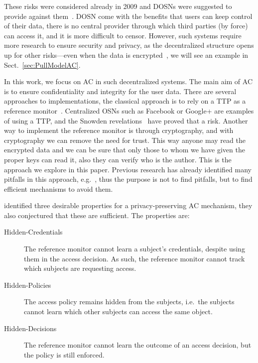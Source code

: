 These risks were considered already in 2009 and \acp{DOSN} were suggested to 
provide against them~\cite[e.g.][]{Peerson}.
\ac{DOSN} come with the benefits that users can keep control of their data, 
there is no central provider through which third parties (by force) can access 
it, and it is more difficult to censor.
However, such systems require more research to ensure security and privacy, as 
the decentralized structure opens up for other risks---even when the data is 
encrypted~\cite{DevilInMetadata}, we will see an example in 
Sect.~\ref{sec:PullModelAC}.

In this work, we focus on \ac{AC} in such decentralized systems.
The main aim of \ac{AC} is to ensure confidentiality and integrity for the user 
data.
There are several approaches to implementations, the classical approach is to 
rely on a \ac{TTP} as a reference monitor~\cite{AccessControl}.
Centralized \acp{OSN} such as Facebook or Google+ are examples of using 
a \ac{TTP}, and the Snowden revelations~\cite{prism} have proved that a risk.
Another way to implement the reference monitor is through cryptography, and 
with cryptography we can remove the need for trust.
This way anyone may read the encrypted data and we can be sure that only those 
to whom we have given the proper keys can read it, also they can verify who is 
the author.
This is the approach we explore in this paper.
Previous research has already identified many pitfalls in this approach, 
e.g.~\cite{DevilInMetadata}, thus the purpose is not to find pitfalls, but to 
find efficient mechanisms to avoid them.

\citet{TowardsPPACwHPHCHD} identified three desirable properties for 
a privacy-preserving \ac{AC} mechanism, they also conjectured that these are 
sufficient.
The properties are:
\begin{description}
  \item[Hidden-Credentials] The reference monitor cannot learn a subject's 
    credentials, despite using them in the access decision.
    As such, the reference monitor cannot track which subjects are requesting 
    access.
  \item[Hidden-Policies] The access policy remains hidden from the subjects, 
    i.e.\ the subjects cannot learn which other subjects can access the same 
    object.
  \item[Hidden-Decisions] The reference monitor cannot learn the outcome of an 
    access decision, but the policy is still enforced.
\end{description}

